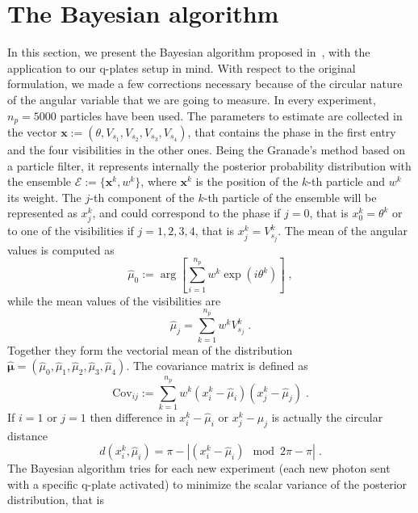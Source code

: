 \documentclass[superscriptaddress,notitlepage,pra]{revtex4-1}
\begin{document}
\section{The Bayesian algorithm}
%
In this section, we present the Bayesian algorithm proposed in~\cite{granade2012robust}, with the application to our q-plates setup in mind. With respect to the original formulation, we made a few corrections necessary because of the circular nature of the angular variable that we are going to measure. In every experiment, $n_p = 5000$ particles have been used. The parameters to estimate are collected in the vector $\boldsymbol{x} := \left( \theta, V_{s_1}, V_{s_2}, V_{s_3}, V_{s_4} \right)$, that contains the phase in the first entry and the four visibilities in the other ones. Being the Granade's method based on a particle filter, it represents internally the posterior probability distribution with the ensemble $\mathcal{E} := \lbrace \boldsymbol{x}^k, w^k \rbrace$, where $\boldsymbol{x}^k$ is the position of the $k$-th particle and $w^k$ its weight. The $j$-th component of the $k$-th particle of the ensemble will be represented as $x_j^k$, and could correspond to the phase if $j=0$, that is $x^k_0 = \theta^k$ or to one of the visibilities if $j=1, 2, 3, 4$, that is $x^k_j = V^k_{s_j}$. The mean of the angular values is computed as
%
\begin{equation}
	\hat{\mu}_0 := \arg \left[ \sum_{i=1}^{n_{p}} w^k \exp \left( i \theta^k \right) \right] \; ,
\end{equation}
%
while the mean values of the visibilities are
%
\begin{equation}
	\hat{\mu}_j = \sum_{k=1}^{n_p} w^k V^k_{s_j} \; .
\end{equation}
%
Together they form the vectorial mean of the distribution $\boldsymbol{\hat{\mu}} = (\hat{\mu}_0, \hat{\mu}_1, \hat{\mu}_2, \hat{\mu}_3, \hat{\mu}_4)$. The covariance matrix is defined as
%
\begin{equation}
	\text{Cov}_{ij} := \sum_{k=1}^{n_{p}} w^k (x^k_i - \hat{\mu}_i)  (x^k_j - \hat{\mu}_j) \; .
\end{equation}
%
If $i=1$ or $j=1$ then difference in $x^k_i - \hat{\mu}_i$ or $x^k_j - \hat{\mu}_j$ is actually the circular distance
%
\begin{equation}
	d(x^k_i, \hat{\mu}_i) = \pi - | (x^k_i - \hat{\mu}_i) \mod 2 \pi - \pi| \; .
\end{equation}
%
The Bayesian algorithm tries for each new experiment (each new photon sent with a specific q-plate activated) to minimize the scalar variance of the posterior distribution, that is
\end{document}
